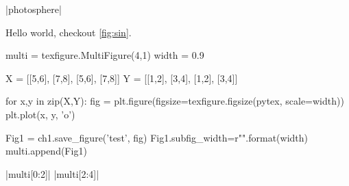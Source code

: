 \py[chapter1]|photosphere|



Hello world, checkout \cref{fig:sin}.


\begin{pycode}[chapter1]
	
multi = texfigure.MultiFigure(4,1)
width = 0.9

X = [[5,6], [7,8], [5,6], [7,8]]
Y = [[1,2], [3,4], [1,2], [3,4]]

for x,y in zip(X,Y):
	fig = plt.figure(figsize=texfigure.figsize(pytex, scale=width))
	plt.plot(x, y, 'o')
	
	Fig1 = ch1.save_figure('test', fig)
	Fig1.subfig_width=r"{}\columnwidth".format(width)
	multi.append(Fig1)
\end{pycode}

\py[chapter1]|multi[0:2]|
\py[chapter1]|multi[2:4]|
